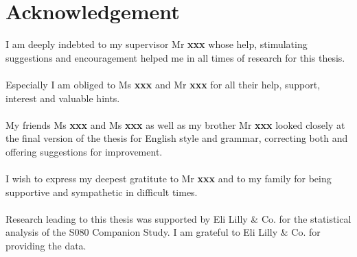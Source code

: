\chapter*{Acknowledgement}

I am deeply indebted to my supervisor Mr \textbf{xxx} whose help, stimulating suggestions and encouragement helped me in all times of research for this thesis.\\\\
Especially I am obliged to Ms \textbf{xxx} and Mr \textbf{xxx} for all their help, support, interest and valuable hints.\\\\
My friends Ms \textbf{xxx} and Ms \textbf{xxx} as well as my brother Mr \textbf{xxx} looked closely at the final version of the thesis for English style and grammar, correcting both and offering suggestions for improvement.\\\\
I wish to express my deepest gratitute to Mr \textbf{xxx} and to my family for being supportive and sympathetic in difficult times.\\\\
Research leading to this thesis was supported by Eli Lilly \& Co. for the statistical analysis of the S080 Companion Study. I am grateful to Eli Lilly \& Co. for providing the data.

